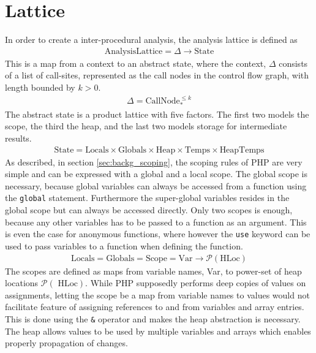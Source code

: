 
\section{Lattice}
\label{sec:lattice}
In order to create a inter-procedural analysis, the analysis lattice is defined as
\begin{align}
\text{AnalysisLattice} = \Delta \rightarrow \text{State}
\end{align}
This is a map from a context to an abstract state, where the context, $\Delta$ consists of a list of call-sites, represented as the call nodes in the control flow graph, with length bounded by $k>0$. 
\begin{align}
\Delta = \text{CallNode}_*^{\leq k}
\end{align}
The abstract state is a product lattice with five factors. The first two models the scope, the third the heap, and the last two models storage for intermediate results. 
\begin{align}
\text{State} = \text{Locals} \times \text{Globals} \times \text{Heap} \times \text{Temps} \times \text{HeapTemps} 
\end{align}
As described, in section \ref{sec:backg_scoping}, the scoping rules of PHP are very simple and can be expressed with a global and a local scope. The global scope is necessary, because global variables can always be accessed from a function using the \texttt{global} statement. Furthermore the super-global variables resides in the global scope but can always be accessed directly. Only two scopes is enough, because any other variables has to be passed to a function as an argument. This is even the case for anonymous functions, where however the \texttt{use} keyword can be used to pass variables to a function when defining the function.
\begin{align}
\text{Locals} = \text{Globals} = \text{Scope} = \text{Var} \rightarrow \mathcal{P}(\text{HLoc})
\end{align}
The scopes are defined as maps from variable names, { Var}, to power-set of heap locations $\mathcal{P}(\text{ HLoc})$. While PHP supposedly performs deep copies of values on assignments, letting the scope be a map from variable names to values would not facilitate feature of assigning references to and from variables and array entries. This is done using the \texttt{\&} operator and makes the heap abstraction is necessary. The heap allows values to be used by multiple variables and arrays which enables properly propagation of changes. 
